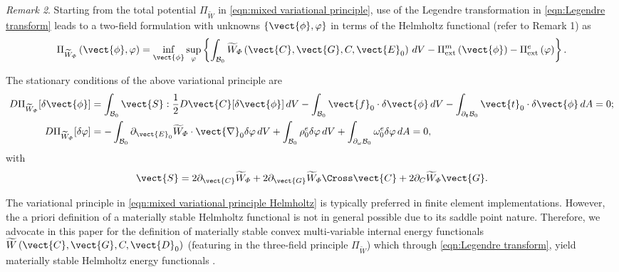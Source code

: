 \noindent \textit{Remark 2}. Starting from the total potential $\Pi_{\widetilde{W}}$ in \eqref{eqn:mixed variational principle}, use of the Legendre transformation in \eqref{eqn:Legendre transform} leads to a two-field formulation with unknowns $\{\vect{\phi},\varphi\}$ in terms of the Helmholtz functional  %
(refer to Remark 1) as
%
\begin{equation}\label{eqn:mixed variational principle Helmholtz}
\begin{aligned}
\Pi_{\widetilde{W}_{\varPhi}}\left(\vect{\phi},\varphi\right) = \inf_{\vect{\phi}}\sup_{\varphi}\left\{
\int_{\mathcal{B}_0}\widetilde{W}_{\varPhi}\left(\vect{C},\vect{G},C,\vect{E}_0\right)\,dV  - \Pi_{\text{ext}}^m\left(\vect{\phi}\right) - \Pi_{\text{ext}}^e\left(\varphi\right)
%
\right\}.
\end{aligned}
\end{equation}

The stationary conditions of the above variational principle are %
%
\begin{equation}\label{eqn:two-field formulation for statics Helmholtz}
\begin{aligned}
D\Pi_{\widetilde{W}_{\varPhi}}[\delta\vect{\phi}]& =  \int_{\mathcal{B}_0}\vect{S}:\frac{1}{2}D\vect{C}[\delta\vect{\phi}]\,dV  - \int_{\mathcal{B}_0}\vect{f}_0\cdot\delta\vect{\phi}\,dV-
\int_{\partial_{\boldsymbol{t}}\mathcal{B}_0}\vect{t}_0\cdot\delta\vect{\phi}\,dA=0;\\
%
D\Pi_{\widetilde{W}_{\varPhi}}[\delta\varphi]& =  -\int_{\mathcal{B}_0}\partial_{\vect{E}_0}\widetilde{W}_{\varPhi}\cdot\vect{\nabla}_0\delta\varphi\,dV + \int_{\mathcal{B}_0}\rho_0^e\delta\varphi\,dV+
\int_{\partial_\omega\mathcal{B}_0}\omega^e_0\delta\varphi\,dA=0,
%
\end{aligned}
\end{equation}
%
with
%
\begin{equation}\label{eqn:Second Piola Helmholtz}
\vect{S} = 2\partial_{\vect{C}}\widetilde{W}_{\varPhi} + 2\partial_{\vect{G}}\widetilde{W}_{\varPhi}\Cross\vect{C} + 
2\partial_{C}\widetilde{W}_{\varPhi}\vect{G}.
\end{equation}

The variational principle in \eqref{eqn:mixed variational principle Helmholtz} is typically preferred in finite element implementations. 
However, the a priori definition of a materially stable Helmholtz functional is not in general possible due to its saddle point nature. 
Therefore, we advocate in this paper for the definition of materially stable convex multi-variable internal energy functionals $\widetilde{W}\left({\vect{C},\vect{G},C,\vect{D}_0}\right)$ (featuring in the three-field principle $\Pi_{\widetilde{W}}$) which through \eqref{eqn:Legendre transform}, yield materially stable Helmholtz energy functionals \cite{Gil_electro_partI_2016}. 

